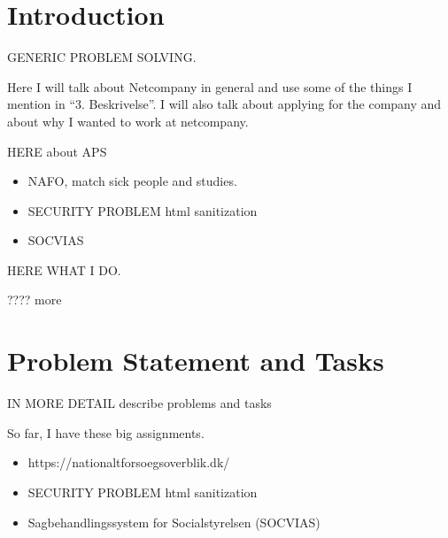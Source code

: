 \documentclass[../main.tex]{subfiles}
\begin{document}
%
%
%
%

\section{Introduction}

GENERIC PROBLEM SOLVING.  

Here I will talk about Netcompany in general and use some of the things I mention in “3. Beskrivelse”. I will also talk about applying for the company and about why I wanted to work at netcompany.  

HERE about APS 

\begin{itemize}
    \item NAFO, match sick people and studies. 
    \item SECURITY PROBLEM html sanitization 
    \item SOCVIAS 
\end{itemize}
HERE WHAT I DO. 


    ???? more 
\section{Problem Statement and Tasks}

IN MORE DETAIL describe problems and tasks 

So far, I have these big assignments. 

\begin{itemize}
    \item  https://nationaltforsoegsoverblik.dk/ 
    \item SECURITY PROBLEM html sanitization 
    \item Sagbehandlingssystem for Socialstyrelsen (SOCVIAS) 
\end{itemize}
\end{document}
